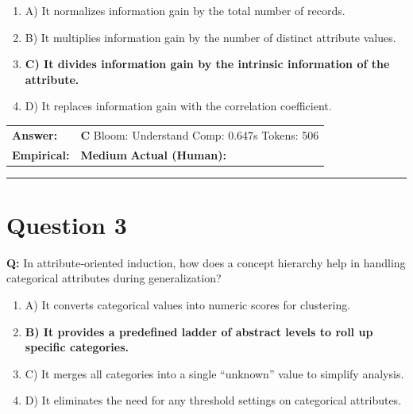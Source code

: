 \documentclass[9pt]{article}
\begin{document}
\begin{enumerate}[label=\textbf{\alph{*})}, nosep]
    \item A) It normalizes information gain by the total number of records.
    \item B) It multiplies information gain by the number of distinct attribute values.
    \item \textbf{C) It divides information gain by the intrinsic information of the attribute.} %
    \item D) It replaces information gain with the correlation coefficient.

\end{enumerate}

\begin{tabular}{@{}l p{10.5cm}@{}}
\textbf{Answer:} & \textbf{C} \hspace{1em} Bloom: Understand \hspace{1em} Comp: 0.647s \hspace{1em} Tokens: 506 \\
\textbf{Empirical:} & \textbf{Medium} \hspace{1em} \textbf{Actual (Human):} \underline{\hspace{5cm}}
\end{tabular}

\vspace{0.2cm}
\rule{\textwidth}{0.4pt}
\vspace{0.2cm}


\section*{Question 3}

\textbf{Q:} In attribute‑oriented induction, how does a concept hierarchy help in handling categorical attributes during generalization?

\begin{enumerate}[label=\textbf{\alph{*})}, nosep]
    \item A) It converts categorical values into numeric scores for clustering.
    \item \textbf{B) It provides a predefined ladder of abstract levels to roll up specific categories.} %
    \item C) It merges all categories into a single “unknown” value to simplify analysis.
    \item D) It eliminates the need for any threshold settings on categorical attributes.

\end{enumerate}
\end{document}
